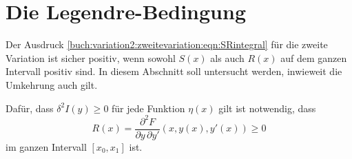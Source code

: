 %
%
%
\section{Die Legendre-Bedingung
\label{buch:variation2:section:legendre}}
Der Ausdruck \eqref{buch:variation2:zweitevariation:eqn:SRintegral}
für die zweite Variation ist sicher positiv, wenn sowohl $S(x)$
als auch $R(x)$ auf dem ganzen Intervall positiv sind.
In diesem Abschnitt soll untersucht werden, inwieweit die
Umkehrung auch gilt.

\begin{satz}
\label{buch:variation2:legendre:satz:legendre}
Dafür, dass $\delta^2I(y)\ge 0$ für jede Funktion $\eta(x)$ gilt ist
notwendig, dass
\[
R(x)
=
\frac{\partial^2F}{\partial y\,\partial y'}(x,y(x),y'(x))
\ge
0
\]
im ganzen Intervall $[x_0,x_1]$ ist.
\end{satz}

